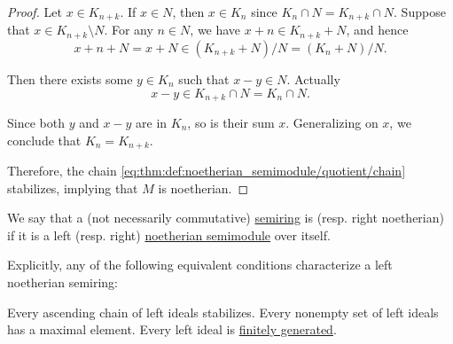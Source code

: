 \begin{proof}
  Let \( x \in K_{n + k} \). If \( x \in N \), then \( x \in K_n \) since \( K_n \cap N = K_{n + k} \cap N \). Suppose that \( x \in K_{n + k} \setminus N \). For any \( n \in N \), we have \( x + n \in K_{n + k} + N \), and hence
  \begin{equation*}
    x + n + N = x + N \in (K_{n + k} + N) / N = (K_n + N) / N.
  \end{equation*}

  Then there exists some \( y \in K_n \) such that \( x - y \in N \). Actually
  \begin{equation*}
    x - y \in K_{n + k} \cap N = K_n \cap N.
  \end{equation*}

  Since both \( y \) and \( x - y \) are in \( K_n \), so is their sum \( x \). Generalizing on \( x \), we conclude that \( K_n = K_{n + k} \).

  Therefore, the chain \eqref{eq:thm:def:noetherian_semimodule/quotient/chain} stabilizes, implying that \( M \) is noetherian.
\end{proof}

\begin{definition}\label{def:noetherian_semiring}
  We say that a (not necessarily commutative) \hyperref[def:semiring]{semiring} is  (resp. right noetherian) if it is a left (resp. right) \hyperref[def:noetherian_semimodule]{noetherian semimodule} over itself.

  Explicitly, any of the following equivalent conditions characterize a left noetherian semiring:
  \begin{thmenum}
     Every ascending chain of left ideals stabilizes.
     Every nonempty set of left ideals has a maximal element.
     Every left ideal is \hyperref[def:semiring_ideal/generated]{finitely generated}.
  \end{thmenum}
\end{definition}

